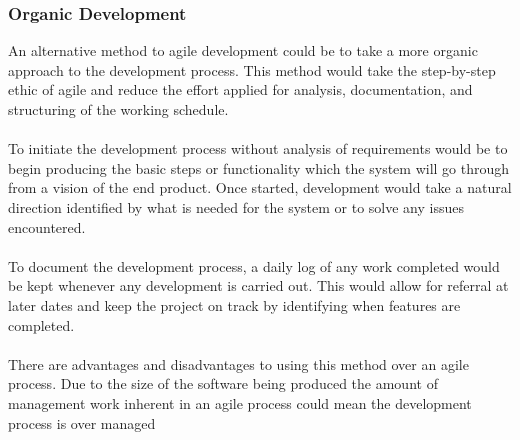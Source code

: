 		\subsubsection{Organic Development}
			An alternative method to agile development could be to take a more organic approach to the development process. This method would take the step-by-step ethic of agile and reduce the effort applied for analysis, documentation, and structuring of the working schedule.
			\\\\
			To initiate the development process without analysis of requirements would be to begin producing the basic steps or functionality which the system will go through from a vision of the end product. Once started, development would take a natural direction identified by what is needed for the system or to solve any issues encountered.
			\\\\
			To document the development process, a daily log of any work completed would be kept  whenever any development is carried out. This would allow for referral at later dates and keep the project on track by identifying when features are completed.
			\\\\
			There are advantages and disadvantages to using this method over an agile process. Due to the size of the software being produced the amount of management work inherent in  an agile process could mean the development process is over managed
